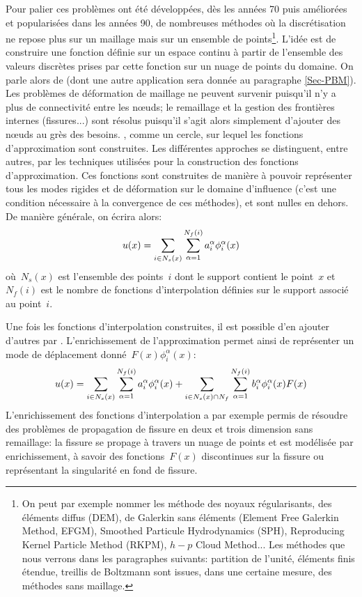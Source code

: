 \medskip
Pour palier ces problèmes ont été développées, dès les années 70 puis améliorées et popularisées dans les années 90, de nombreuses méthodes où la discrétisation ne repose plus sur un maillage mais sur un ensemble de points\footnote{On peut par exemple nommer les méthode des noyaux régularisants, des éléments diffus (DEM), de Galerkin sans éléments (Element Free Galerkin Method, EFGM), Smoothed Particule Hydrodynamics (SPH), Reproducing Kernel Particle Method (RKPM), $h-p$ Cloud Method... Les méthodes que nous verrons dans les paragraphes suivants: partition de l'unité, éléments finis étendue, treillis de Boltzmann sont issues, dans une certaine mesure, des méthodes sans maillage.}.
L'idée est de construire une fonction définie sur un espace continu à partir de l'ensemble des valeurs discrètes prises par cette fonction sur un nuage de points du domaine. On parle alors de  (dont une autre application sera donnée au paragraphe \ref{Sec-PBM}). Les problèmes de déformation de maillage ne peuvent survenir puisqu'il n'y a plus de connectivité entre les nœuds; le remaillage et la gestion des frontières internes (fissures...) sont résolus puisqu'il s'agit alors simplement d'ajouter des nœuds au grès des besoins.
, comme un cercle, sur lequel les fonctions d'approximation sont construites. Les différentes approches se distinguent, entre autres, par les techniques utilisées pour la construction des fonctions d'approximation. Ces fonctions sont construites de manière à pouvoir représenter tous les modes rigides et de déformation sur le domaine d'influence (c'est une condition nécessaire à la convergence de ces méthodes), et sont nulles en dehors. De manière générale, on écrira alors:
\begin{equation}\label{Eq-meshless}
u(x) = \displaystyle\sum_{i\in N_s(x)}\displaystyle\sum_{\alpha=1}^{N_f(i)} a_i^\alpha \phi_i^\alpha(x)
\end{equation}
où~$N_s(x)$ est l'ensemble des points~$i$ dont le support contient le point~$x$ et~$N_f (i)$ est le nombre de fonctions d'interpolation définies sur le support associé au point~$i$.

\medskip
Une fois les fonctions d'interpolation construites, il est possible d'en ajouter d'autres par . L'enrichissement de l'approximation permet ainsi de représenter un mode de déplacement donné~$F(x)\phi_i^\alpha(x)$:
\begin{equation}
u(x) = \displaystyle\sum_{i\in N_s(x)}\displaystyle\sum_{\alpha=1}^{N_f(i)} a_i^\alpha \phi_i^\alpha(x) + \displaystyle\sum_{i\in N_s(x)\cap N_f}\displaystyle\sum_{\alpha=1}^{N_f(i)} b_i^\alpha\phi_i^\alpha(x)F(x)
\end{equation}
L'enrichissement des fonctions d'interpolation a par exemple permis de résoudre des problèmes de propagation de fissure en deux et trois dimension sans remaillage: la fissure se propage à travers un nuage de points et est modélisée par enrichissement, à savoir des fonctions~$F(x)$ discontinues sur la fissure ou représentant la singularité en fond de fissure.

